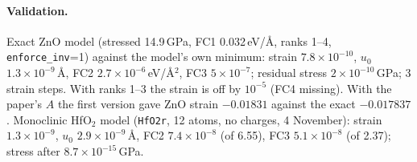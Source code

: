 \documentclass[11pt,a4paper]{article}
\newcommand{\code}[1]{\texttt{#1}}
\begin{document}
\paragraph{Validation.} Exact ZnO model (stressed 14.9\,GPa, FC1 0.032\,eV/\AA, ranks 1--4,
\code{enforce\_inv}=1) against the model's own minimum: strain $7.8\times10^{-10}$, $u_0$ $1.3\times10^{-9}$\,\AA,
FC2 $2.7\times10^{-6}$\,eV/\AA$^2$, FC3 $5\times10^{-7}$; residual stress $2\times10^{-10}$\,GPa; 3 strain steps.
With ranks 1--3 the strain is off by $10^{-5}$ (FC4 missing). With the paper's $A$ the first version gave ZnO
strain $-0.01831$ against the exact $-0.017837$. Monoclinic HfO$_2$ model (\code{HfO2r}, 12 atoms, no
charges, 4 November): strain $1.3\times10^{-9}$, $u_0$ $2.9\times10^{-9}$\,\AA, FC2 $7.4\times10^{-8}$ (of 6.55),
FC3 $5.1\times10^{-8}$ (of 2.37); stress after $8.7\times10^{-15}$\,GPa.
\end{document}
